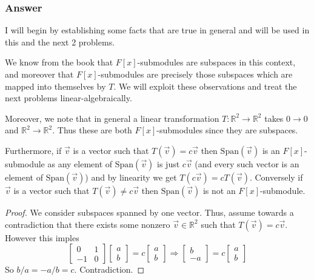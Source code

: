 \documentclass[12pt]{article}
\begin{document}
\subsubsection{Answer}\label{general}
I will begin by establishing some facts that are true in general and will be used in this and the next 2 problems.

We know from the book that  $F[x]$-submodules  are subspaces in this context, and moreover that  $F[x]$-submodules are precisely those subspaces which are mapped into themselves by $T$. We will exploit these observations and treat the next problems linear-algebraically.

Moreover, we note that in general a linear transformation $T: \mathbb{R}^2 \to \mathbb{R}^2$ takes $0 \to 0$ and $\mathbb{R}^2 \to \mathbb{R}^2$. Thus these are both  $F[x]$-submodules since they are subspaces. 

Furthermore, if $\vec{v}$ is a vector such that $T(\vec{v}) = c \vec{v}$ then $\mathrm{Span}(\vec{v})$ is an  $F[x]$-submodule as any element of $\mathrm{Span}(\vec{v})$ is just $c \vec{v}$ (and every such vector is an element of $\mathrm{Span}(\vec{v})$) and by linearity we get $T(c \vec{v})= c T(\vec{v})$. Conversely if  $\vec{v}$ is a vector such that $T(\vec{v}) \neq c \vec{v}$ then $\mathrm{Span}(\vec{v})$ is not an  $F[x]$-submodule.

\begin{proof}We consider subspaces spanned by one vector. Thus, assume towards a contradiction that there exists some nonzero $\vec{v} \in \mathbb{R}^2 $ such that $T(\vec{v})= c \vec{v}$. However this imples
\[\left[ \begin{array} {lr}0 & 1\\-1 &0 \end{array} \right] \left[ \begin{array} {lr}a\\ b \end{array} \right] = c \left[ \begin{array} {lr}a \\b \end{array} \right] \Rightarrow  \left[ \begin{array} {lr}b \\-a \end{array} \right]  = c \left[ \begin{array} {lr}a \\b \end{array} \right]   \]
So $b/a = -a/b = c$. Contradiction.
\end{proof}
\end{document}
